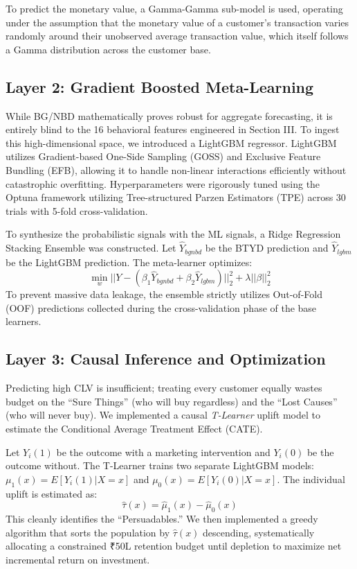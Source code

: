 \documentclass[10pt,conference]{IEEEtran}
\begin{document}
To predict the monetary value, a Gamma-Gamma sub-model is used, operating under the assumption that the monetary value of a customer's transaction varies randomly around their unobserved average transaction value, which itself follows a Gamma distribution across the customer base.

\subsection{Layer 2: Gradient Boosted Meta-Learning}
While BG/NBD mathematically proves robust for aggregate forecasting, it is entirely blind to the 16 behavioral features engineered in Section III. To ingest this high-dimensional space, we introduced a LightGBM regressor. LightGBM utilizes Gradient-based One-Side Sampling (GOSS) and Exclusive Feature Bundling (EFB), allowing it to handle non-linear interactions efficiently without catastrophic overfitting. Hyperparameters were rigorously tuned using the Optuna framework utilizing Tree-structured Parzen Estimators (TPE) across 30 trials with 5-fold cross-validation.

To synthesize the probabilistic signals with the ML signals, a Ridge Regression Stacking Ensemble was constructed. Let $\hat{Y}_{bgnbd}$ be the BTYD prediction and $\hat{Y}_{lgbm}$ be the LightGBM prediction. The meta-learner optimizes:
$$ \min_w ||Y - (\beta_1 \hat{Y}_{bgnbd} + \beta_2 \hat{Y}_{lgbm})||_2^2 + \lambda ||\beta||_2^2 $$
To prevent massive data leakage, the ensemble strictly utilizes Out-of-Fold (OOF) predictions collected during the cross-validation phase of the base learners.

\subsection{Layer 3: Causal Inference and Optimization}
Predicting high CLV is insufficient; treating every customer equally wastes budget on the ``Sure Things'' (who will buy regardless) and the ``Lost Causes'' (who will never buy). We implemented a causal \textit{T-Learner} uplift model to estimate the Conditional Average Treatment Effect (CATE). 

Let $Y_i(1)$ be the outcome with a marketing intervention and $Y_i(0)$ be the outcome without. The T-Learner trains two separate LightGBM models: $\mu_1(x) = E[Y_i(1) | X=x]$ and $\mu_0(x) = E[Y_i(0) | X=x]$. The individual uplift is estimated as:
$$ \hat{\tau}(x) = \hat{\mu}_1(x) - \hat{\mu}_0(x) $$
This cleanly identifies the ``Persuadables.'' We then implemented a greedy algorithm that sorts the population by $\hat{\tau}(x)$ descending, systematically allocating a constrained ₹50L retention budget until depletion to maximize net incremental return on investment.
\end{document}
